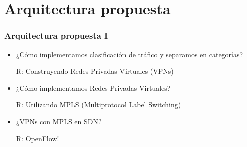 \documentclass{beamer}
\begin{document}
\section{Arquitectura propuesta} 
\frame{\tableofcontents[currentsection]}

\begin{frame}
\frametitle{Arquitectura propuesta I} 

\begin{itemize}
\item ¿C\'omo implementamos clasificación de tr\'afico y separamos en categorías?

\pause
{\color{blue}R: Construyendo Redes Privadas Virtuales (VPNs)}
\pause

\vspace{0.5cm}
\item ¿C\'omo implementamos Redes Privadas Virtuales?

\pause
{\color{blue}R: Utilizando MPLS (Multiprotocol Label Switching)}

\pause
\vspace{0.5cm}
\item ¿VPNs con MPLS en SDN?

\pause
{\color{blue}R: OpenFlow!}

\end{itemize}

\end{frame}


%
%
%
%
\end{document}
